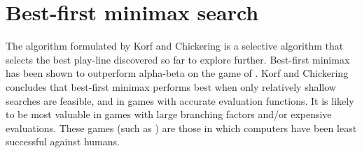   




\section{Best-first minimax search}
\label{sec:tree-best-first}
The  algorithm formulated by Korf and Chickering  \cite{korf:best} is a selective algorithm that selects the best play-line discovered so far to explore further. Best-first minimax has been shown to outperform alpha-beta on the game of .  Korf and Chickering concludes that best-first minimax performs best when only relatively shallow searches are feasible, and in games with accurate evaluation functions.  It is likely to be most valuable in games with large branching factors and/or expensive evaluations.  These games (such as ) are those in which computers have been least successful against humans.    

